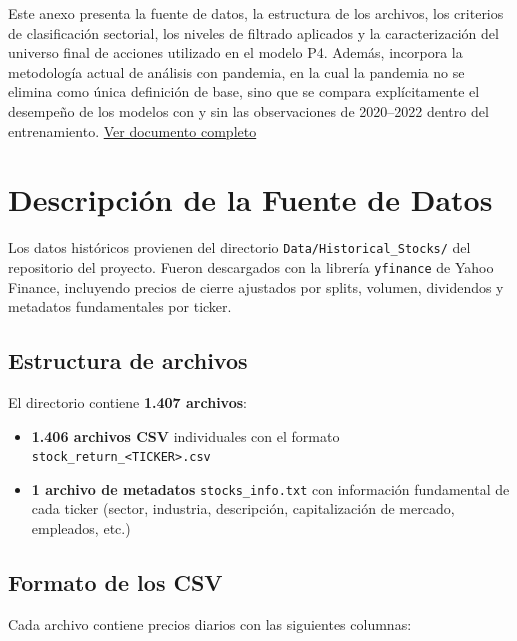 Este anexo presenta la fuente de datos, la estructura de los archivos,
los criterios de clasificación sectorial, los niveles de filtrado aplicados
y la caracterización del universo final de acciones utilizado en el modelo P4.
Además, incorpora la metodología actual de análisis con pandemia, en la cual
la pandemia no se elimina como única definición de base, sino que se compara
explícitamente el desempeño de los modelos con y sin las observaciones de
2020--2022 dentro del entrenamiento. \href{https://uccll0.sharepoint.com/:b:/s/uc365_ics2122_g13/IQC6DdeUo4z_Rasgvtcqt8K_AU8x_53YNQQFx14ckIB1xdY?e=DNEyTn}{Ver documento completo}

\section*{Descripción de la Fuente de Datos}

Los datos históricos provienen del directorio \texttt{Data/Historical\_Stocks/}
del repositorio del proyecto. Fueron descargados con la librería
\texttt{yfinance} de Yahoo Finance, incluyendo precios de cierre ajustados
por splits, volumen, dividendos y metadatos fundamentales por ticker.

\subsection*{Estructura de archivos}

El directorio contiene \textbf{1.407 archivos}:

\begin{itemize}
  \item \textbf{1.406 archivos CSV} individuales con el formato
        \texttt{stock\_return\_<TICKER>.csv}
  \item \textbf{1 archivo de metadatos} \texttt{stocks\_info.txt} con
        información fundamental de cada ticker (sector, industria,
        descripción, capitalización de mercado, empleados, etc.)
\end{itemize}

\subsection*{Formato de los CSV}

Cada archivo contiene precios diarios con las siguientes columnas:

